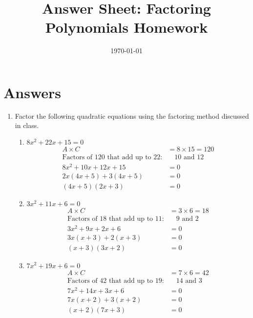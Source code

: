 \documentclass[12pt]{article}
\title{Answer Sheet: Factoring Polynomials Homework}
\author{\today}
\date{}
\begin{document}
\maketitle

\section*{Answers}

\begin{enumerate}
    \item Factor the following quadratic equations using the factoring method discussed in class.
    \begin{enumerate}
        \item $8x^2 + 22x + 15 = 0$
        \begin{align*}
            A \times C & = 8 \times 15 = 120 \\
            \text{Factors of 120 that add up to 22:} & \quad 10 \text{ and } 12 \\
            8x^2 + 10x + 12x + 15 &= 0 \\
            2x(4x + 5) + 3(4x + 5) &= 0 \\
            (4x + 5)(2x + 3) &= 0
        \end{align*}
        
        \item $3x^2 + 11x + 6 = 0$
        \begin{align*}
            A \times C & = 3 \times 6 = 18 \\
            \text{Factors of 18 that add up to 11:} & \quad 9 \text{ and } 2 \\
            3x^2 + 9x + 2x + 6 &= 0 \\
            3x(x + 3) + 2(x + 3) &= 0 \\
            (x + 3)(3x + 2) &= 0
        \end{align*}
        
        \item $7x^2 + 19x + 6 = 0$
        \begin{align*}
            A \times C & = 7 \times 6 = 42 \\
            \text{Factors of 42 that add up to 19:} & \quad 14 \text{ and } 3 \\
            7x^2 + 14x + 3x + 6 &= 0 \\
            7x(x + 2) + 3(x + 2) &= 0 \\
            (x + 2)(7x + 3) &= 0
        \end{align*}
        

\end{enumerate}
\end{enumerate}
\end{document}
